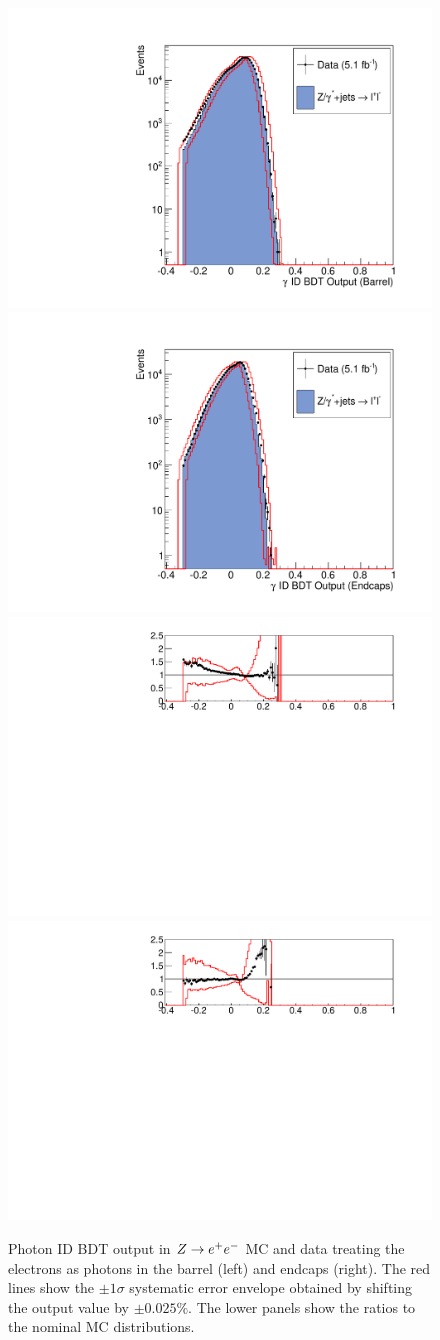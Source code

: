 \begin{figure}
  \includegraphics[width=.48\textwidth]{hgg7TeV/zeeValidation/phoID_EB.pdf}
  \includegraphics[width=.48\textwidth]{hgg7TeV/zeeValidation/phoID_EE.pdf}\\
  \includegraphics[width=.48\textwidth]{hgg7TeV/zeeValidation/phoID_EB_ratio.pdf}
  \includegraphics[width=.48\textwidth]{hgg7TeV/zeeValidation/phoID_EE_ratio.pdf}\\
\caption{Photon ID BDT output in $Z\rightarrow e^{+}e^{-}$ MC and data 
treating the electrons as photons in the barrel (left) and endcaps (right). 
The red lines show the $\pm 1\sigma$ systematic error envelope obtained by shifting the output value by $\pm 0.025\%$.
The lower panels show the ratios to the nominal MC distributions.}
\label{fig:zeevalidphoidmva}
\end{figure}

